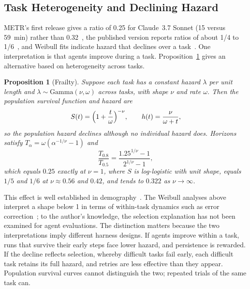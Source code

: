 \documentclass[journal]{IEEEtran}
\newtheorem{proposition}{Proposition}
\begin{document}
\subsection{Task Heterogeneity and Declining Hazard}\label{sec:frailty}
METR's first release gives a ratio of 0.25 for Claude~3.7 Sonnet (15 versus 59~min) rather than 0.32~\cite{kwa2025v1}, the published version reports ratios of about 1/4 to 1/6~\cite{kwa2025}, and Weibull fits indicate hazard that declines over a task~\cite{hamilton2026,ord2026}. One interpretation is that agents improve during a task. Proposition~\ref{prop:frailty} gives an alternative based on heterogeneity across tasks.

\begin{proposition}[Frailty]\label{prop:frailty}
Suppose each task has a constant hazard $\lambda$ per unit length and $\lambda\sim\mathrm{Gamma}(\nu,\omega)$ across tasks, with shape $\nu$ and rate $\omega$. Then the population survival function and hazard are
\begin{equation}\label{eq:frailty}
S(t)=\Bigl(1+\frac{t}{\omega}\Bigr)^{-\nu},\qquad h(t)=\frac{\nu}{\omega+t},
\end{equation}
so the population hazard declines although no individual hazard does. Horizons satisfy $T_\alpha=\omega(\alpha^{-1/\nu}-1)$ and
\begin{equation}\label{eq:frailtyratio}
\frac{T_{0.8}}{T_{0.5}}=\frac{1.25^{1/\nu}-1}{2^{1/\nu}-1},
\end{equation}
which equals $0.25$ exactly at $\nu=1$, where $S$ is log-logistic with unit shape, equals $1/5$ and $1/6$ at $\nu\approx0.56$ and $0.42$, and tends to $0.322$ as $\nu\to\infty$.
\end{proposition}

This effect is well established in demography~\cite{vaupel1979}. The Weibull analyses above interpret a shape below 1 in terms of within-task dynamics such as error correction~\cite{hamilton2026,ord2026}; to the author's knowledge, the selection explanation has not been examined for agent evaluations. The distinction matters because the two interpretations imply different harness designs. If agents improve within a task, runs that survive their early steps face lower hazard, and persistence is rewarded. If the decline reflects selection, whereby difficult tasks fail early, each difficult task retains its full hazard, and retries are less effective than they appear. Population survival curves cannot distinguish the two; repeated trials of the same task can.
\end{document}
